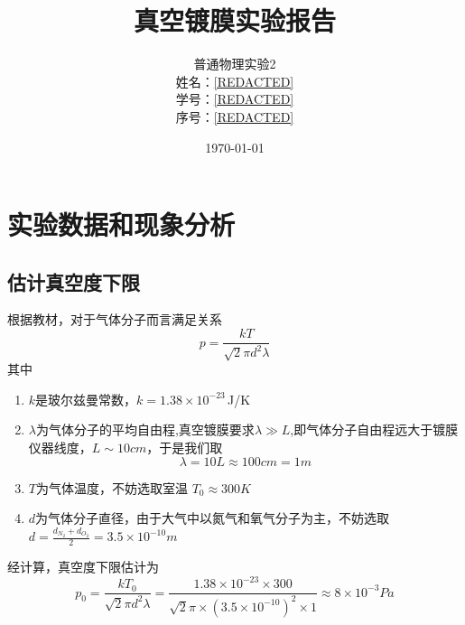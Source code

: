 \documentclass[12pt]{article}
\title{\Large\textbf {真空镀膜实验报告}}
\author{普通物理实验2\\
        姓名：\underline{\hspace{1cm}[REDACTED]\hspace{1cm}} \\
        学号：\underline{\hspace{0.5cm}[REDACTED]\hspace{0.5cm}} \\
        序号：\underline{\hspace{1.3cm}[REDACTED]\hspace{1.3cm}}}
\date{\today}
\begin{document}
\maketitle
\section{实验数据和现象分析}
\subsection{估计真空度下限}
根据教材，对于气体分子而言满足关系
\begin{equation}
    p  = \frac{kT}{\sqrt{2}\pi d^2\lambda}
\end{equation}
其中
\begin{enumerate}
    \item $k$是玻尔兹曼常数，$k=1.38\times 10^{-23}$\,J/K
    \item $\lambda$为气体分子的平均自由程,真空镀膜要求$\lambda \gg L$,即气体分子自由程远大于镀膜仪器线度，$L \sim 10cm$，于是我们取
        \begin{equation*} 
            \lambda = 10 L \approx 100cm = 1m
        \end{equation*}
    \item $T$为气体温度，不妨选取室温 $T_0 \approx 300K $
    \item $d$为气体分子直径，由于大气中以氮气和氧气分子为主，不妨选取 $d = \frac{d_{N_2}+d_{O_2}}{2} = 3.5\times 10^{-10}m$
\end{enumerate}
经计算，真空度下限估计为
\begin{equation*}
    p_0 = \frac{kT_0}{\sqrt{2}\pi d^2\lambda} = \frac{1.38\times 10^{-23}\times 300}{\sqrt{2}\pi \times (3.5\times 10^{-10})^2 \times 1} \approx 8\times 10^{-3}Pa
\end{equation*}
\end{document}
